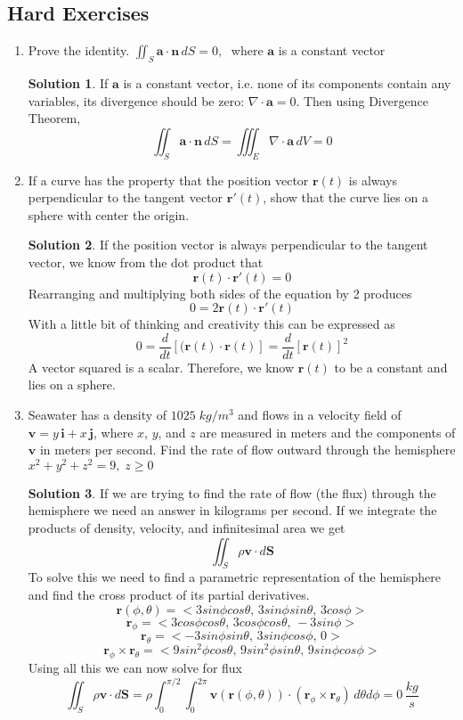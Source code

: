 \documentclass[]{book}
\theoremstyle{definition}
\newtheorem*{soln}{Solution}
\begin{document}
\newpage
\subsection*{Hard Exercises}
\begin{enumerate}
    \item   Prove the identity. $\iint_S \mathbf{a} \cdot \mathbf{n}\,dS=0,\;$ where $\mathbf{a}$ is a constant vector
    \begin{soln}
        If $\mathbf{a}$ is a constant vector, i.e. none of its components contain any variables, its divergence should be zero: $\nabla \cdot \mathbf{a}=0$. Then using Divergence Theorem,
        $$\iint_S \mathbf{a} \cdot \mathbf{n}\,dS=\iiint_E \nabla \cdot \mathbf{a}\,dV=0$$
    \end{soln}
    
    \item   If a curve has the property that the position vector $\mathbf{r}(t)$ is always perpendicular to the tangent vector $\mathbf{r}'(t)$, show that the curve lies on a sphere with center the origin.
    \begin{soln}
        If the position vector is always perpendicular to the tangent vector, we know from the dot product that
        $$\mathbf{r}(t) \cdot \mathbf{r}'(t)=0$$
        Rearranging and multiplying both sides of the equation by 2 produces
        $$0=2\mathbf{r}(t) \cdot \mathbf{r}'(t)$$
        With a little bit of thinking and creativity this can be expressed as
        $$0=\frac{d}{dt}[(\mathbf{r}(t) \cdot \mathbf{r}(t)]=\frac{d}{dt}[\mathbf{r}(t)]^2$$
        A vector squared is a scalar. Therefore, we know $\mathbf{r}(t)$ to be a constant and lies on a sphere.
    \end{soln}

    \item   Seawater has a density of $1025\;kg/m^3$ and flows in a velocity field of $\mathbf{v}=y\,\mathbf{i}+x\,\mathbf{j}$, where $x$, $y$, and $z$ are measured in meters and the components of $\mathbf{v}$ in meters per second. Find the rate of flow outward through the hemisphere $x^2+y^2+z^2=9,\;z \geq 0$
    \begin{soln}
        If we are trying to find the rate of flow (the flux) through the hemisphere we need an answer in kilograms per second. If we integrate the products of density, velocity, and infinitesimal area we get 
        $$\iint_S \rho \mathbf{v} \cdot d\mathbf{S}$$
        To solve this we need to find a parametric representation of the hemisphere and find the cross product of its partial derivatives. 
        $$\mathbf{r}(\phi, \theta)=<3sin\phi cos\theta,\,3sin\phi sin\theta,\, 3cos\phi>$$
        $$\mathbf{r}_\phi=<3cos\phi cos\theta,\,3cos\phi cos\theta,\, -3sin\phi>$$
        $$\mathbf{r}_\theta=<-3sin\phi sin\theta,\,3sin\phi cos\phi,\,0>$$
        $$\mathbf{r}_\phi \times \mathbf{r}_\theta=<9sin^2\phi cos\theta,\,9sin^2\phi sin\theta,\, 9sin\phi cos\phi>$$
        Using all this we can now solve for flux
        $$\iint_S \rho \mathbf{v} \cdot d\mathbf{S}=\rho \int_{0}^{\pi / 2}\int_{0}^{2\pi}\mathbf{v}(\mathbf{r}(\phi, \theta)) \cdot (\mathbf{r}_\phi \times \mathbf{r}_\theta)\,d\theta d\phi = 0\, \frac{kg}{s}$$
    \end{soln}
    
\end{enumerate}
\end{document}
